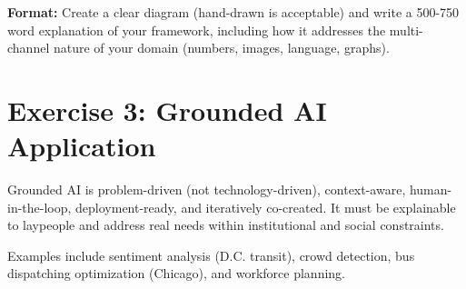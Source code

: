 \documentclass[11pt]{article}
\begin{document}
\textbf{Format:} Create a clear diagram (hand-drawn is acceptable) and write a 500-750 word explanation of your framework, including how it addresses the multi-channel nature of your domain (numbers, images, language, graphs). 

\section*{Exercise 3: Grounded AI Application}

Grounded AI is problem-driven (not technology-driven), context-aware, human-in-the-loop, deployment-ready, and iteratively co-created. It must be explainable to laypeople and address real needs within institutional and social constraints.

Examples include sentiment analysis (D.C. transit), crowd detection, bus dispatching optimization (Chicago), and workforce planning.
\end{document}
